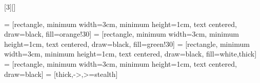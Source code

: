 [3][]{
}

\usepackage{tikz}      %
\usepackage{float}     %
\usepackage{bytefield} %

\usetikzlibrary{shapes.geometric, arrows, positioning, decorations.pathreplacing, calc}
 = [rectangle, minimum width=3cm, minimum height=1cm, text centered, draw=black, fill=orange!30]
 = [rectangle, minimum width=3cm, minimum height=1cm, text centered, draw=black, fill=green!30]
 = [rectangle, minimum width=3cm, minimum height=1cm, text centered, draw=black, fill=white,thick]
 = [rectangle, minimum width=3cm, minimum height=1cm, text centered, draw=black]
 = [thick,->,>=stealth]


\newcommand{\tikzfigure}[3]{%
  \vspace{\baselineskip}%
  \begin{figure}[H]%
    \centering%
    \caption{#2}%
    \label{fig:#3}%
  \end{figure}%
}

\usepackage{listings}
\usepackage{color}
\usepackage{xcolor}


